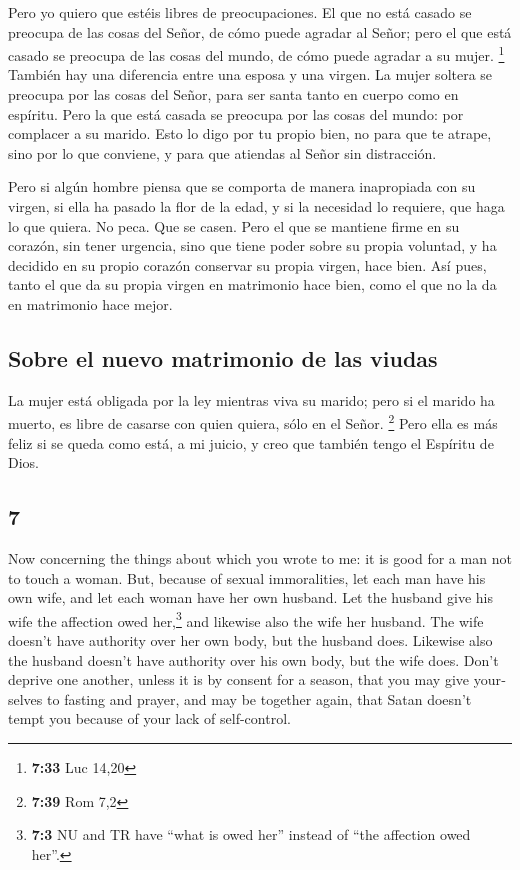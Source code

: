 \begin{paracol}{2}
 Pero yo quiero que estéis libres de preocupaciones. El
que no está casado se preocupa de las cosas del Señor, de cómo puede
agradar al Señor;  pero el que está casado se preocupa de
las cosas del mundo, de cómo puede agradar a su mujer. \footnote{\textbf{7:33}
  Luc 14,20}  También hay una diferencia entre una esposa
y una virgen. La mujer soltera se preocupa por las cosas del Señor, para
ser santa tanto en cuerpo como en espíritu. Pero la que está casada se
preocupa por las cosas del mundo: por complacer a su marido.
 Esto lo digo por tu propio bien, no para que te atrape,
sino por lo que conviene, y para que atiendas al Señor sin distracción.

 Pero si algún hombre piensa que se comporta de manera
inapropiada con su virgen, si ella ha pasado la flor de la edad, y si la
necesidad lo requiere, que haga lo que quiera. No peca. Que se casen.
 Pero el que se mantiene firme en su corazón, sin tener
urgencia, sino que tiene poder sobre su propia voluntad, y ha decidido
en su propio corazón conservar su propia virgen, hace bien.
 Así pues, tanto el que da su propia virgen en matrimonio
hace bien, como el que no la da en matrimonio hace mejor.

\hypertarget{sobre-el-nuevo-matrimonio-de-las-viudas}{%
\subsection{Sobre el nuevo matrimonio de las
viudas}\label{sobre-el-nuevo-matrimonio-de-las-viudas}}

 La mujer está obligada por la ley mientras viva su
marido; pero si el marido ha muerto, es libre de casarse con quien
quiera, sólo en el Señor. \footnote{\textbf{7:39} Rom 7,2}
 Pero ella es más feliz si se queda como está, a mi
juicio, y creo que también tengo el Espíritu de Dios.

\switchcolumn
\begin{otherlanguage}{english}

\hypertarget{section-13}{%
\section{7}\label{section-13}}

 Now concerning the things about which you wrote to me: it
is good for a man not to touch a woman.  But, because of
sexual immoralities, let each man have his own wife, and let each woman
have her own husband.  Let the husband give his wife the
affection owed her,\footnote{\textbf{7:3} NU and TR have ``what is owed
  her'' instead of ``the affection owed her''.} and likewise also the
wife her husband.  The wife doesn't have authority over
her own body, but the husband does. Likewise also the husband doesn't
have authority over his own body, but the wife does. 
Don't deprive one another, unless it is by consent for a season, that
you may give yourselves to fasting and prayer, and may be together
again, that Satan doesn't tempt you because of your lack of
self-control.


\end{otherlanguage}
\end{paracol}
